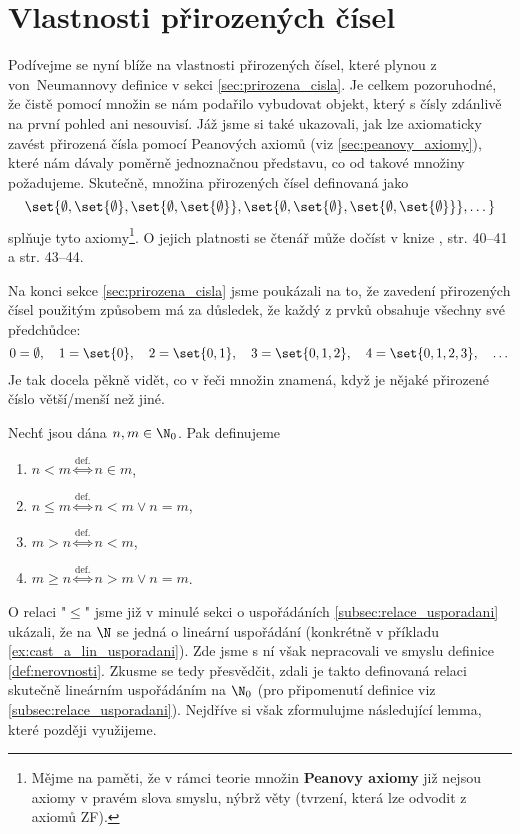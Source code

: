 \section{Vlastnosti přirozených čísel}\label{sec:vlastnosti_prirozenych_cisel}
Podívejme se nyní blíže na vlastnosti přirozených čísel, které plynou z von~Neumannovy definice v sekci \ref{sec:prirozena_cisla}. Je celkem pozoruhodné, že čistě pomocí množin se nám podařilo vybudovat objekt, který s čísly zdánlivě na první pohled ani nesouvisí. Jáž jsme si také ukazovali, jak lze axiomaticky zavést přirozená čísla pomocí Peanových axiomů (viz \ref{sec:peanovy_axiomy}), které nám dávaly poměrně jednoznačnou představu, co od takové množiny požadujeme. Skutečně, množina přirozených čísel definovaná jako
\begin{equation*}
    \set{\emptyset,\set{\emptyset},\set{\emptyset,\set{\emptyset}},\set{\emptyset,\set{\emptyset},\set{\emptyset,\set{\emptyset}}},\dots}
\end{equation*}
splňuje tyto axiomy\footnote{Mějme na paměti, že v rámci teorie množin \textbf{Peanovy axiomy} již nejsou axiomy v pravém slova smyslu, nýbrž věty (tvrzení, která lze odvodit z axiomů \textsf{ZF}).}. O jejich platnosti se čtenář může dočíst v knize \cite{Goldrei2017}, str. 40--41 a str. 43--44.\par
Na konci sekce \ref{sec:prirozena_cisla} jsme poukázali na to, že zavedení přirozených čísel použitým způsobem má za důsledek, že každý z prvků obsahuje všechny své předchůdce:
\begin{equation*}
    0=\emptyset,\quad 1=\set{0},\quad 2=\set{0,1},\quad 3=\set{0,1,2},\quad 4=\set{0,1,2,3},\quad\dots
\end{equation*}
Je tak docela pěkně vidět, co v řeči množin znamená, když je nějaké přirozené číslo větší/menší než jiné.
\begin{definition}\label{def:nerovnosti}
    Nechť jsou dána $n,m\in\N_0$. Pak definujeme
    \begin{enumerate}[label=(\roman*)]
        \item $n<m\stackrel{\text{def.}}{\iff}n\in m$,
        \item $n\leq m\stackrel{\text{def.}}{\iff}n<m\lor n=m$,
        \item $m>n\stackrel{\text{def.}}{\iff}n<m$,
        \item $m\geq n\stackrel{\text{def.}}{\iff}n>m\lor n=m$.
    \end{enumerate}
\end{definition}
O relaci "$\leq$" jsme již v minulé sekci o uspořádáních \ref{subsec:relace_usporadani} ukázali, že na $\N$ se jedná o lineární uspořádání (konkrétně v příkladu \ref{ex:cast_a_lin_usporadani}). Zde jsme s ní však nepracovali ve smyslu definice \ref{def:nerovnosti}. Zkusme se tedy přesvědčit, zdali je takto definovaná relaci skutečně lineárním uspořádáním na $\N_0$ (pro připomenutí definice viz \ref{subsec:relace_usporadani}). Nejdříve si však zformulujme následující lemma, které později využijeme.
